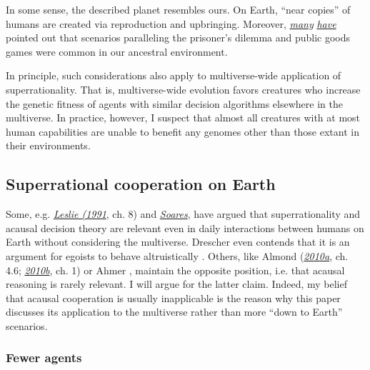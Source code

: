 In some sense, the described planet resembles ours. On Earth, ``near
copies'' of humans are created via reproduction and upbringing.
Moreover,
\href{http://mindingourway.com/newcomblike-problems-are-the-norm/}{\emph{many}}
\href{https://en.wikipedia.org/wiki/Prisoner\%27s_dilemma\#Real-life_examples}{\emph{have}}
pointed out that scenarios paralleling the prisoner's dilemma and public
goods games were common in our ancestral environment.

In principle, such considerations also apply to multiverse-wide
application of superrationality. That is, multiverse-wide evolution
favors creatures who increase the genetic fitness of agents with similar
decision algorithms elsewhere in the multiverse. In practice, however, I
suspect that almost all creatures with at most human capabilities are
unable to benefit any genomes other than those extant in their
environments.

\hypertarget{superrational-cooperation-on-earth}{\subsection{Superrational
cooperation on Earth}\label{superrational-cooperation-on-earth}}

Some, e.g.
\href{http://www.jstor.org/stable/2254984?seq=1\#page_scan_tab_contents}{\emph{Leslie
(1991}}, ch. 8) and
\href{http://mindingourway.com/newcomblike-problems-are-the-norm/}{\emph{Soares}}, have argued that
superrationality and acausal decision theory
are relevant even in daily interactions between humans on Earth without
considering the multiverse. Drescher even contends that it is an
argument for egoists to behave altruistically \parencite{Drescher2006-ky}. Others, like Almond
(\href{https://casparoesterheld.files.wordpress.com/2016/12/almond_edt_1.pdf}{\emph{2010a}},
ch. 4.6;
\href{https://web.archive.org/web/20120310010225/http://www.paul-almond.com/Correlation2.pdf}{\emph{2010b}},
ch. 1) or Ahmer \parencite{Ahmed2014-ec}, maintain the opposite
position, i.e. that acausal reasoning is rarely relevant. I will argue
for the latter claim. Indeed, my belief that acausal cooperation is
usually inapplicable is the reason why this paper discusses its
application to the multiverse rather than more ``down to Earth''
scenarios.

\subsubsection{Fewer agents}\label{fewer-agents}

